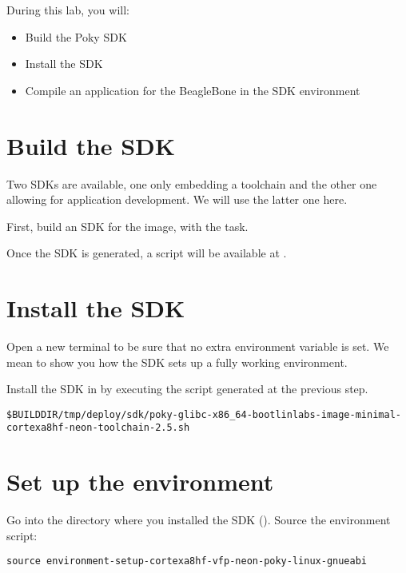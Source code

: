 
During this lab, you will:
\begin{itemize}
  \item Build the Poky SDK
  \item Install the SDK
  \item Compile an application for the BeagleBone in the SDK
    environment
\end{itemize}

\section{Build the SDK}

Two SDKs are available, one only embedding a toolchain and the
other one allowing for application development. We will use the latter one
here.

First, build an SDK for the  image, with
the  task.

Once the SDK is generated, a script will be available at
.

\section{Install the SDK}

Open a new terminal to be sure that no extra environment variable is set.
We mean to show you how the SDK sets up a fully working environment.

Install the SDK in  by executing the script
generated at the previous step.

{\footnotesize
\begin{verbatim}
$BUILDDIR/tmp/deploy/sdk/poky-glibc-x86_64-bootlinlabs-image-minimal-cortexa8hf-neon-toolchain-2.5.sh
\end{verbatim}
}

\section{Set up the environment}

Go into the directory where you installed the SDK
(). Source the environment script:
\begin{verbatim}
source environment-setup-cortexa8hf-vfp-neon-poky-linux-gnueabi
\end{verbatim}

